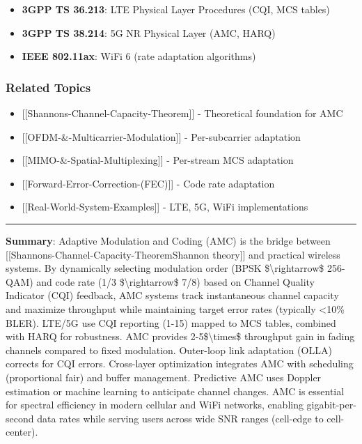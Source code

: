 \begin{itemize}
\tightlist
\item
  \textbf{3GPP TS 36.213}: LTE Physical Layer Procedures (CQI, MCS
  tables)
\item
  \textbf{3GPP TS 38.214}: 5G NR Physical Layer (AMC, HARQ)
\item
  \textbf{IEEE 802.11ax}: WiFi 6 (rate adaptation algorithms)
\end{itemize}

\subsubsection{Related Topics}\label{related-topics}

\begin{itemize}
\tightlist
\item
  {[}{[}Shannon\textquotesingle s-Channel-Capacity-Theorem{]}{]} -
  Theoretical foundation for AMC
\item
  {[}{[}OFDM-\&-Multicarrier-Modulation{]}{]} - Per-subcarrier
  adaptation
\item
  {[}{[}MIMO-\&-Spatial-Multiplexing{]}{]} - Per-stream MCS adaptation
\item
  {[}{[}Forward-Error-Correction-(FEC){]}{]} - Code rate adaptation
\item
  {[}{[}Real-World-System-Examples{]}{]} - LTE, 5G, WiFi implementations
\end{itemize}

\begin{center}\rule{0.5\linewidth}{0.5pt}\end{center}

\textbf{Summary}: Adaptive Modulation and Coding (AMC) is the bridge
between
{[}{[}Shannon\textquotesingle s-Channel-Capacity-Theorem\textbar Shannon
theory{]}{]} and practical wireless systems. By dynamically selecting
modulation order (BPSK \$\textbackslash rightarrow\$ 256-QAM) and code
rate (1/3 \$\textbackslash rightarrow\$ 7/8) based on Channel Quality
Indicator (CQI) feedback, AMC systems track instantaneous channel
capacity and maximize throughput while maintaining target error rates
(typically \textless10\% BLER). LTE/5G use CQI reporting (1-15) mapped
to MCS tables, combined with HARQ for robustness. AMC provides
2-5\$\textbackslash times\$ throughput gain in fading channels compared
to fixed modulation. Outer-loop link adaptation (OLLA) corrects for CQI
errors. Cross-layer optimization integrates AMC with scheduling
(proportional fair) and buffer management. Predictive AMC uses Doppler
estimation or machine learning to anticipate channel changes. AMC is
essential for spectral efficiency in modern cellular and WiFi networks,
enabling gigabit-per-second data rates while serving users across wide
SNR ranges (cell-edge to cell-center).
